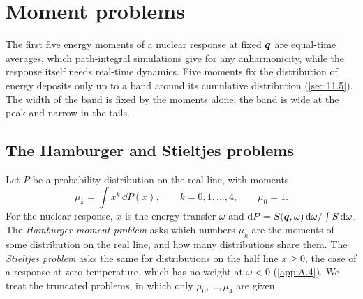 \section{Moment problems}\label{app:C.10}

The first five energy moments of a nuclear response at fixed $\bm{q}$ are equal-time averages, which path-integral simulations give for any anharmonicity, while the response itself needs real-time dynamics. Five moments fix the distribution of energy deposits only up to a band around its cumulative distribution (\cref{sec:11.5}). The width of the band is fixed by the moments alone; the band is wide at the peak and narrow in the tails.

\subsection{The Hamburger and Stieltjes problems}

Let $P$ be a probability distribution on the real line, with moments
\begin{equation}
  \mu_k = \int x^k\,\dd P(x), \qquad k = 0, 1, \dots, 4, \qquad \mu_0 = 1 .
  \label{eq:C.10-moments}
\end{equation}
For the nuclear response, $x$ is the energy transfer $\omega$ and $\mathrm{d} P = S(\bm{q},\omega)\,\mathrm{d}\omega/\int S\,\mathrm{d}\omega$. The \emph{Hamburger moment problem} asks which numbers $\mu_k$ are the moments of some distribution on the real line, and how many distributions share them. The \emph{Stieltjes problem} asks the same for distributions on the half line $x \ge 0$, the case of a response at zero temperature, which has no weight at $\omega < 0$ (\cref{app:A.4}). We treat the truncated problems, in which only $\mu_0, \dots, \mu_4$ are given.

